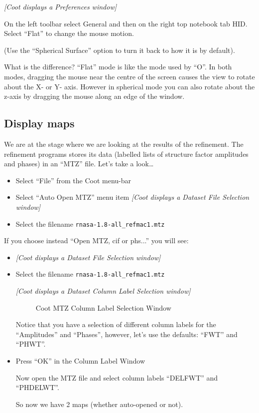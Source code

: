 \documentclass{article}
\begin{document}
\textsl{  [Coot displays a Preferences window]}

On the left toolbar select \textsf{General} and then on the right top 
notebook tab \textsf{HID}. Select \textsf{``Flat''} to change the mouse motion.

(Use the \textsf{``Spherical Surface''} option to turn it back to how
it is by default).


What is the difference? ``Flat'' mode is like the mode used by ``O''.
In both modes, dragging the mouse near the centre of the screen causes
the view to rotate about the X- or Y- axis. However in spherical mode
you can also rotate about the z-axis by dragging the mouse along an
edge of the window.

\subsection{Display maps}

We are at the stage where we are looking at the results of the
refinement.  The refinement programs stores its data (labelled lists
of structure factor amplitudes and phases) in an ``MTZ'' file.  Let's
take a look\ldots


\begin{itemize}
\item Select \textsf{``File''} from the Coot menu-bar
\item Select \textsf{``Auto Open MTZ''} menu item
\textsl{  [Coot displays a Dataset File Selection window]}
\item Select the filename \texttt{rnasa-1.8-all\_refmac1.mtz}
\end{itemize}

If you choose instead ``Open MTZ, cif or phs...'' you will see:
\begin{itemize}

\item
\textsl{  [Coot displays a Dataset File Selection window]}

\item Select the filename \texttt{rnasa-1.8-all\_refmac1.mtz}

\textsl{  [Coot displays a Dataset Column Label Selection window]}


\begin{figure}[htbp]
  \begin{center}
    \leavevmode
    \epsfxsize 30mm
    \caption{Coot MTZ Column Label Selection Window}
    \label{fig:mtz_columns}
  \end{center}
\end{figure}

Notice that you have a selection of different column labels for the
``Amplitudes'' and ``Phases'', however, let's use the defaults:
``FWT'' and ``PHWT''.

\item Press \textsf{``OK''} in the Column Label Window

Now open the MTZ file and select column labels ``DELFWT'' and ``PHDELWT''.

So now we have 2 maps (whether auto-opened or not).
\end{itemize}
\end{document}
